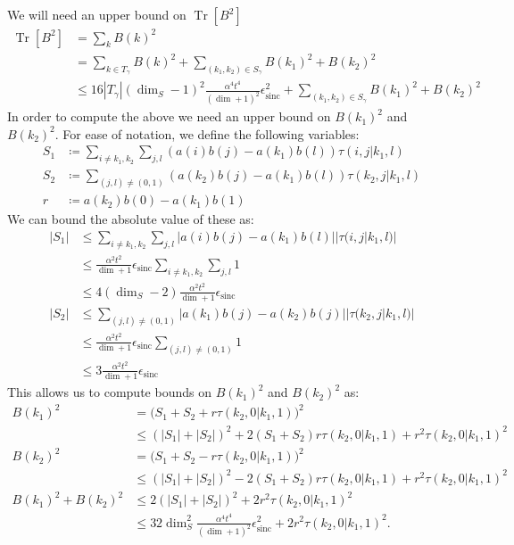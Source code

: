 \documentclass{article}
\newcommand{\brackets}[1]{\left[ #1 \right]}
\newcommand{\abs}[1]{\left| #1 \right|}
\DeclareMathOperator{\Tr}{Tr}
\newcommand{\trace}[1]{\Tr \brackets{ #1 }}
\DeclareMathOperator{\sinc}{sinc}
\begin{document}
We will need an upper bound on $\trace{B^2}$
\begin{align}
    \trace{B^2} &= \sum_k B(k)^2 \\
    &= \sum_{k \in T_{\gamma}} B(k)^2 + \sum_{(k_1, k_2) \in S_{\gamma}} B(k_1)^2 + B(k_2)^2 \\
    &\leq 16 |T_{\gamma}| (\dim_S - 1)^2 \frac{\alpha^4 t^4}{(\dim + 1)^2}\epsilon_{\sinc}^2 + \sum_{(k_1, k_2) \in S_{\gamma}} B(k_1)^2 + B(k_2)^2
\end{align}
In order to compute the above we need an upper bound on $B(k_1)^2$ and $B(k_2)^2$. For ease of notation, we define the following variables:
\begin{align}
    S_1 &\coloneqq \sum_{i \neq k_1, k_2} \sum_{j,l} (a(i) b(j) - a(k_1) b(l)) \tau(i, j|k_1, l) \\
    S_2 &\coloneqq \sum_{(j,l) \neq (0, 1)} (a(k_2) b(j) - a(k_1) b(l)) \tau(k_2, j| k_1, l) \\
    r &\coloneqq a(k_2) b(0) - a(k_1) b(1) 
\end{align}
We can bound the absolute value of these as:
\begin{align}
    \abs{S_1} &\leq \sum_{i \neq k_1, k_2} \sum_{j,l} |a(i) b(j) - a(k_1) b(l)| |\tau(i, j|k_1, l)| \\
    &\leq \frac{\alpha^2 t^2}{\dim + 1} \epsilon_{\sinc} \sum_{i \neq k_1, k_2} \sum_{j,l} 1\\
    &\leq 4 (\dim_S - 2) \frac{\alpha^2 t^2}{\dim + 1} \epsilon_{\sinc} \\
    \abs{S_2} &\leq \sum_{(j,l) \neq (0,1)} |a(k_1) b(j) - a(k_2) b(j)| |\tau(k_2, j | k_1, l)| \\
    &\leq \frac{\alpha^2 t^2}{\dim + 1} \epsilon_{\sinc} \sum_{(j,l) \neq (0,1)} 1 \\
    &\leq 3 \frac{\alpha^2 t^2}{\dim + 1} \epsilon_{\sinc}
\end{align}
This allows us to compute bounds on $B(k_1)^2$ and $B(k_2)^2$ as:
\begin{align}
    B(k_1)^2 &= \bigg( S_1 + S_2 + r \tau(k_2, 0| k_1, 1) \bigg)^2 \\
    &\leq (|S_1| + |S_2|)^2 + 2(S_1 + S_2) r \tau(k_2, 0| k_1, 1) + r^2 \tau(k_2, 0| k_1, 1)^2 \\
    B(k_2)^2 &= \bigg( S_1 + S_2 - r \tau(k_2, 0 | k_1, 1) \bigg)^2 \\
    &\leq (|S_1| + |S_2|)^2 - 2 (S_1 + S_2) r \tau(k_2, 0 | k_1, 1) + r^2 \tau(k_2, 0 | k_1, 1)^2 \\
    B(k_1)^2 + B(k_2)^2 &\leq 2 (|S_1| + |S_2|)^2 + 2 r^2 \tau(k_2, 0 | k_1, 1)^2 \\
    &\leq 32 \dim_S^2 \frac{\alpha^4 t^4}{(\dim + 1)^2} \epsilon_{\sinc}^2 + 2 r^2 \tau(k_2, 0 | k_1, 1)^2.
\end{align}
\end{document}
